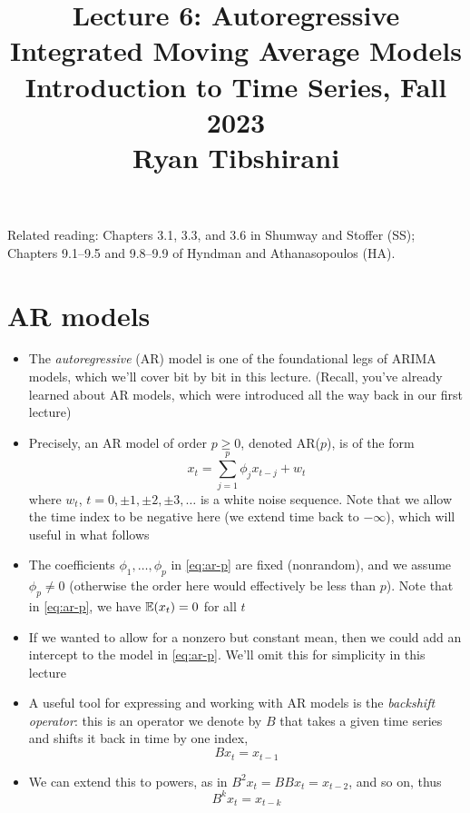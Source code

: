 \documentclass{article}
\title{Lecture 6: Autoregressive Integrated Moving Average Models \\ \smallskip  
\large Introduction to Time Series, Fall 2023 \\ \smallskip
Ryan Tibshirani}
\date{}
\begin{document}
\maketitle
\RaggedRight
\vspace{-50pt}

Related reading: Chapters 3.1, 3.3, and 3.6 in Shumway and Stoffer (SS);
Chapters 9.1--9.5 and 9.8--9.9 of Hyndman and Athanasopoulos (HA).   

\section{AR models}

\begin{itemize}
\item The \emph{autoregressive} (AR) model is one of the foundational legs of
  ARIMA models, which we'll cover bit by bit in this lecture. (Recall, you've
  already learned about AR models, which were introduced all the way back in our 
  first lecture)  

\item Precisely, an AR model of order $p \geq 0$, denoted AR($p$), is of the
  form 
  \begin{equation}
  \label{eq:ar-p}
  x_t = \sum_{j=1}^p \phi_j x_{t-j} + w_t
  \end{equation}
  where $w_t$, $t = 0, \pm 1, \pm 2, \pm 3, \dots$ is a white noise
  sequence. Note that we allow the time index to be negative here (we extend
  time back to $-\infty$), which will useful in what follows 

\item The coefficients $\phi_1,\dots,\phi_p$ in \eqref{eq:ar-p} are fixed
  (nonrandom), and we assume $\phi_p \not= 0$ (otherwise the order here would
  effectively be less than $p$). Note that in \eqref{eq:ar-p}, we have $\mathbb{E}(x_t)
  = 0$ for all $t$

\item If we wanted to allow for a nonzero but constant mean, then we could add
  an intercept to the model in \eqref{eq:ar-p}. We'll omit this for simplicity
  in this lecture  

\item A useful tool for expressing and working with AR models is the
  \emph{backshift operator}: this is an operator we denote by $B$ that takes a 
  given time series and shifts it back in time by one index,
  \[
  B x_t = x_{t-1}
  \]

\item We can extend this to powers, as in $B^2 x_t = B B x_t = x_{t-2}$, and so
  on, thus   
  \[
  B^k x_t = x_{t-k} 
  \]


\end{itemize}
\end{document}
